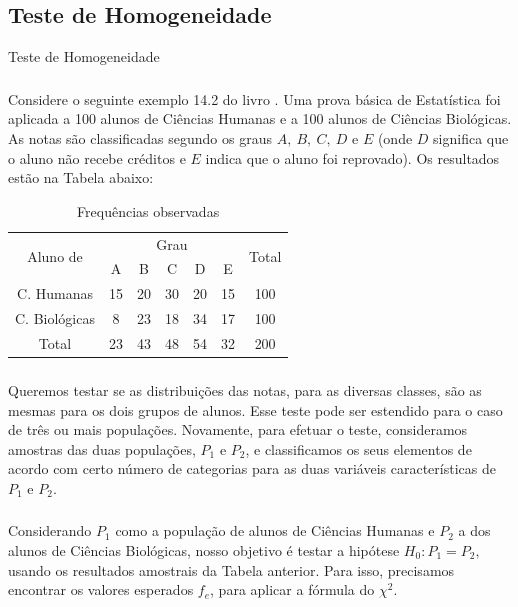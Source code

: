 \documentclass[14pt,aspectratio=1610]{beamer}
\newcommand{\Ho}{\ensuremath{H_{0}}}
\begin{document}
\subsection{Teste de Homogeneidade}
\begin{frame}{Teste de Homogeneidade}
\frametitle{}
\begin{block}{}
\justifying
Considere o seguinte exemplo 14.2 do livro \cite{Morettin09}. Uma prova básica de Estatística foi aplicada a 100 alunos de Ciências Humanas e a 100 alunos de Ciências Biológicas. As notas são classificadas segundo os graus $A,\ B,\ C,\ D$ e $E$ (onde $D$ significa que o aluno não recebe créditos e $E$ indica que o aluno foi reprovado). Os resultados estão na Tabela abaixo:

\begin{table}{}
\caption{Frequências observadas}
\begin{tabular}{c|c|c|c|c|c|c}
\multirow{2}{*}{Aluno de}&\multicolumn{5}{c}{Grau}&\multirow{2}{*}{Total}\\
\cline{2-6}
                         &A&B&C&D&E&\\
\hline
C. Humanas    &15& 20& 30& 20& 15& 100\\
C. Biológicas &8  &23 &18 &34 &17 &100\\
\hline
Total         &23& 43& 48& 54& 32& 200\\
\hline

\end{tabular}
\end{table}
\end{block}
\end{frame}

\begin{frame}{}
\frametitle{}
\begin{block}{}
\justifying
Queremos testar se as distribuições das notas, para as diversas classes, são as mesmas para os dois grupos de alunos. Esse teste pode ser estendido para o caso de três ou mais populações. Novamente, para efetuar o teste, consideramos amostras das duas populações, $P_1$ e $P_2$, e classificamos os seus elementos de acordo com certo número de categorias para as duas variáveis características de $P_1$ e $P_2.$
\end{block}
\end{frame}

\begin{frame}{}
\frametitle{}
\begin{block}{}
\justifying
Considerando $P_1$ como a população de alunos de Ciências Humanas e $P_2$ a dos alunos de Ciências Biológicas, nosso objetivo é testar a hipótese $\Ho : P_1 = P_2,$
usando os resultados amostrais da Tabela anterior. Para isso, precisamos encontrar os
valores esperados $f_{e}$, para aplicar a fórmula do $\chi^{2}.$

\end{block}
\end{frame}
\end{document}
